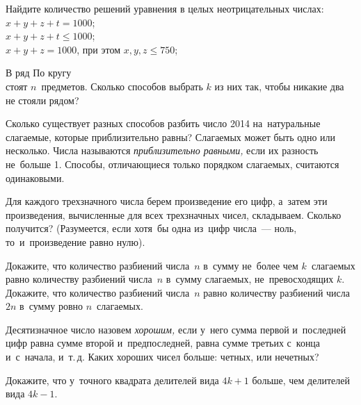 


\begin{problems}

\item
Найдите количество решений уравнения в целых неотрицательных числах:
\\
\subproblem $x + y + z + t = 1000$;
\\
\subproblem $x + y + z + t \leq 1000$;
\\
\subproblem $x + y + z = 1000$, при этом $x, y, z \leq 750$;

\item
\subproblem
В ряд
\qquad
\subproblem
По кругу
\\
стоят $n$~предметов.
Сколько способов выбрать $k$ из них так, чтобы никакие два не стояли рядом?

\item
Сколько существует разных способов разбить число 2014 на~натуральные слагаемые,
которые приблизительно равны?
Слагаемых может быть одно или несколько.
Числа называются \emph{приблизительно равными,} если их разность не~больше 1.
Способы, отличающиеся только порядком слагаемых, считаются одинаковыми.

\item
Для каждого трехзначного числа берем произведение его цифр, а~затем эти
произведения, вычисленные для всех трехзначных чисел, складываем.
Сколько получится?
(Разумеется, если хотя~бы одна из~цифр числа~--- ноль, то~и~произведение равно
нулю).

\item
\subproblem
Докажите, что количество разбиений числа~$n$ в~сумму не~более чем
$k$~слагаемых равно количеству разбиений числа~$n$ в~сумму слагаемых,
не~превосходящих $k$.
\\
\subproblem
Докажите, что количество разбиений числа~$n$ равно количеству разбиений
числа~$2n$ в~сумму ровно $n$~слагаемых.

\item
Десятизначное число назовем \emph{хорошим,} если у~него сумма первой
и~последней цифр равна сумме второй и~предпоследней, равна сумме третьих
с~конца и~с~начала, и~т.\,д.
Каких хороших чисел больше: четных, или нечетных?

\item
Докажите, что у~точного квадрата делителей вида $4k + 1$ больше, чем делителей
вида $4 k - 1$.

\end{problems}

